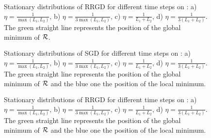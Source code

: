 \begin{figure}[h!]
	\centering
	\scalebox{0.45}{}
	\caption{Stationary distributions of RRGD for different time steps on \exOne: a) $\eta=\frac{1}{\max(L_1,L_2)}$, b) $\eta=\frac{1}{3\max(L_1,L_2)}$, c) $\eta=\frac{1}{L_1+L_2}$, d) $\eta=\frac{1}{3(L_1+L_2)}$. The green straight line represents the position of the global minimum of $\mathcal{R}$.}
	\label{RRGD_ex1}
\end{figure}

\begin{figure}[h!]
	\centering
	\scalebox{0.45}{}
	\caption{Stationary distributions of SGD for different time steps on \exTwo: a) $\eta=\frac{1}{\max(L_1,L_2)}$, b) $\eta=\frac{1}{3\max(L_1,L_2)}$, c) $\eta=\frac{1}{L_1+L_2}$, d) $\eta=\frac{1}{3(L_1+L_2)}$. The green straight line represents the position of the global minimum of $\mathcal{R}$ and the blue one the position of the local minimum.}
	\label{sgd_ex2}
\end{figure}

\begin{figure}[h!]
	\centering
	\scalebox{0.45}{}
	\caption{Stationary distributions of RRGD for different time steps on \exTwo: a) $\eta=\frac{1}{\max(L_1,L_2)}$, b) $\eta=\frac{1}{3\max(L_1,L_2)}$, c) $\eta=\frac{1}{L_1+L_2}$, d) $\eta=\frac{1}{3(L_1+L_2)}$. The green straight line represents the position of the global minimum of $\mathcal{R}$ and the blue one the position of the local minimum.}
	\label{RRGD_ex2}
\end{figure}


